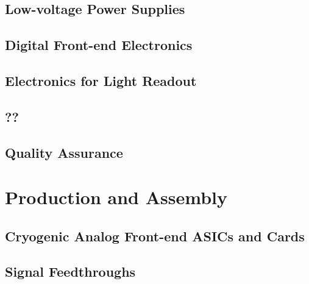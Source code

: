 \subsection{Low-voltage Power Supplies}
\label{sec:fddp-tpc-elec-design-lvps}

\subsection{Digital Front-end Electronics}
\label{sec:fddp-tpc-elec-design-utca}


\subsection{Electronics for Light Readout}
\label{sec:fddp-tpc-elec-design-lro}


\subsection{??}
\label{sec:fddp-tpc-elec-??}

\subsection{Quality Assurance}
\label{sec:fddp-tpc-elec-qa}




\section{Production and Assembly}
\label{sec:fddp-tpc-elec-prod-assy}


\subsection{Cryogenic Analog Front-end ASICs and Cards}
\label{sec:fddp-tpc-elec-prod-fe}

\subsection{Signal Feedthroughs}
\label{sec:fddp-tpc-elec-prod-sft}


